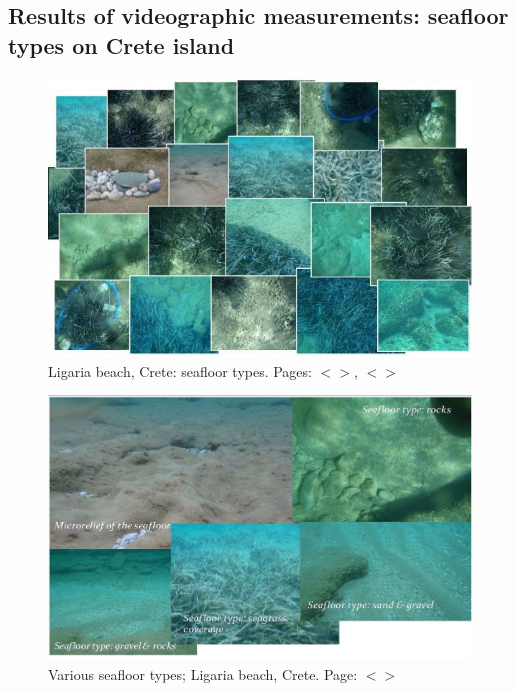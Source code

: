 \documentclass[11pt]{article}
\begin{document}
\begin{appendices}
\subsection{Results of videographic measurements: seafloor types on Crete island}

\begin{figure}[H]
	\begin{center}
		\includegraphics[scale=0.67]{Fig-3-14.jpg}
		\caption{Ligaria beach, Crete: seafloor types. Pages: $<$\pageref{page-28}$>$, $<$\pageref{page-39}$>$}\label{fig:A.5}
	\end{center}
\end{figure}

\begin{figure}[H]
	\begin{center}
		\includegraphics[scale=0.3]{Fig-3-15.jpg}
		\caption{Various seafloor types; Ligaria beach, Crete. Page: $<$\pageref{page-28}$>$}\label{fig:A.6}
	\end{center}
\end{figure}


\end{appendices}
\end{document}
